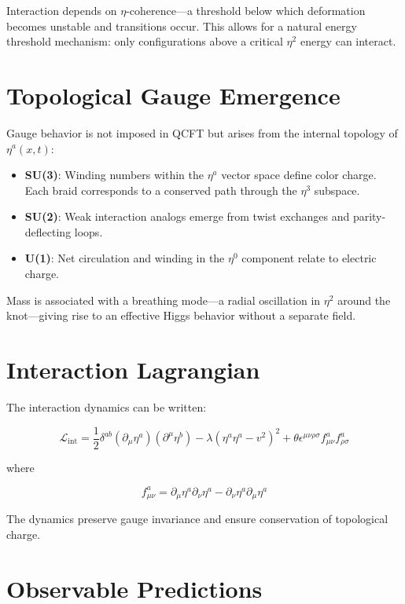 \documentclass[12pt]{article}
\begin{document}
Interaction depends on $\eta$-coherence---a threshold below which deformation becomes unstable and transitions occur. This allows for a natural energy threshold mechanism: only configurations above a critical $\eta^2$ energy can interact.

\section{Topological Gauge Emergence}

Gauge behavior is not imposed in QCFT but arises from the internal topology of $\eta^a(x,t)$:

\begin{itemize}
\item \textbf{SU(3)}: Winding numbers within the $\eta^a$ vector space define color charge. Each braid corresponds to a conserved path through the $\eta^3$ subspace.
\item \textbf{SU(2)}: Weak interaction analogs emerge from twist exchanges and parity-deflecting loops.
\item \textbf{U(1)}: Net circulation and winding in the $\eta^0$ component relate to electric charge.
\end{itemize}

Mass is associated with a breathing mode---a radial oscillation in $\eta^2$ around the knot---giving rise to an effective Higgs behavior without a separate field.

\section{Interaction Lagrangian}

The interaction dynamics can be written:

\[
\mathcal{L}_\text{int} = \frac{1}{2} \delta^{ab} (\partial_\mu \eta^a)(\partial^\mu \eta^b) - \lambda (\eta^a \eta^a - v^2)^2 + \theta \epsilon^{\mu\nu\rho\sigma} f^a_{\mu\nu} f^a_{\rho\sigma}
\]

where

\[
f^a_{\mu\nu} = \partial_\mu \eta^a \partial_\nu \eta^a - \partial_\nu \eta^a \partial_\mu \eta^a
\]

The dynamics preserve gauge invariance and ensure conservation of topological charge.

\section{Observable Predictions}
\end{document}
